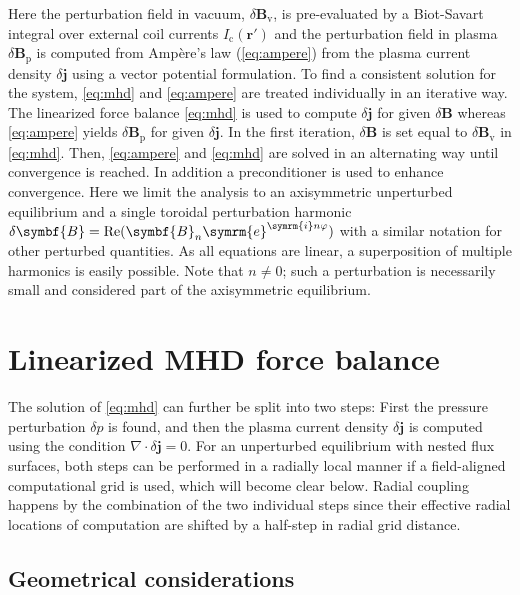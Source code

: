 \documentclass[a4paper, 10pt, english]{article}
\let\temp\varrho
\let\varrho\rho
\let\rho\temp
\let\temp\vartheta
\let\vartheta\theta
\let\theta\temp
\let\temp\varphi
\let\varphi\phi
\let\phi\temp
\let\vec\symbf
\newcommand*\e{\ensuremath{\symrm{e}}}  %
\newcommand*\im{\ensuremath{\symrm{i}}}  %
\DeclareMathOperator\Real{Re}
\begin{document}
Here the perturbation field in vacuum, $\delta \vec{B}_{\text{v}}$, is pre-evaluated by a Biot-Savart integral over external coil currents $I_{\text{c}} (\vec{r}')$ and the perturbation field in plasma $\delta \vec{B}_{\text{p}}$ is computed from Ampère's law (\ref{eq:ampere}) from the plasma current density $\delta \vec{j}$ using a vector potential formulation. To find a consistent solution for the system, \cref{eq:mhd} and \cref{eq:ampere} are treated individually in an iterative way. The linearized force balance \cref{eq:mhd} is used to compute $\delta \vec{j}$ for given $\delta \vec{B}$ whereas \cref{eq:ampere} yields $\delta \vec{B}_{\text{p}}$ for given $\delta \vec{j}$. In the first iteration, $\delta \vec{B}$ is set equal to $\delta \vec{B}_{\text{v}}$ in \cref{eq:mhd}. Then, \cref{eq:ampere} and \cref{eq:mhd} are solved in an alternating way until convergence is reached. In addition a preconditioner is used to enhance convergence. Here we limit the analysis to an axisymmetric unperturbed equilibrium and a single toroidal perturbation harmonic $\delta \vec{B} = \Real (\vec{B}_{n} \e^{\im n \phi})$ with a similar notation for other perturbed quantities. As all equations are linear, a superposition of multiple harmonics is easily possible. Note that $n \neq 0$; such a perturbation is necessarily small and considered part of the axisymmetric equilibrium.

\section{Linearized MHD force balance}

The solution of \cref{eq:mhd} can further be split into two steps: First the pressure perturbation $\delta p$ is found, and then the plasma current density $\delta \vec{j}$ is computed using the condition $\nabla \cdot \delta \vec{j} = 0$. For an unperturbed equilibrium with nested flux surfaces, both steps can be performed in a radially local manner if a field-aligned computational grid is used, which will become clear below. Radial coupling happens by the combination of the two individual steps since their effective radial locations of computation are shifted by a half-step in radial grid distance.

\subsection{Geometrical considerations}
\end{document}
